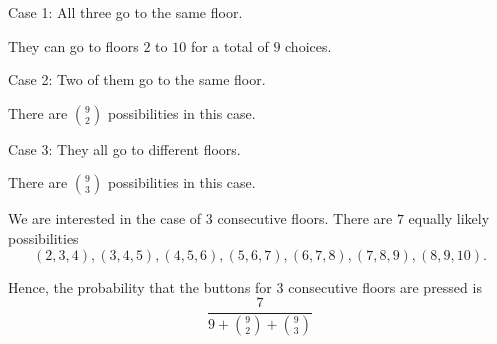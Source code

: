 Case 1: All three go to the same floor.

They can go to floors $2$ to $10$ for a total of $9$ choices.

Case 2: Two of them go to the same floor.

There are $9 \choose 2$ possibilities in this case.

Case 3: They all go to different floors.

There are $9 \choose 3$ possibilities in this case.

We are interested in the case of $3$ consecutive floors. There are $7$ equally likely possibilities $$(2, 3, 4), (3, 4, 5), (4, 5, 6), (5, 6, 7), (6, 7, 8), (7, 8, 9), (8, 9, 10).$$

Hence, the probability that the buttons for $3$ consecutive floors are pressed is $$\frac{7}{9 + {9 \choose 2} + {9 \choose 3}}$$